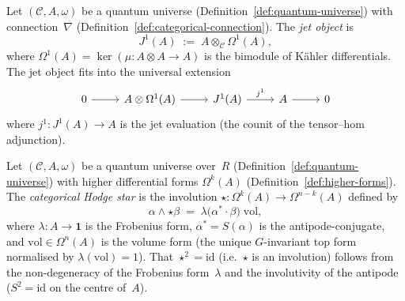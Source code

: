 \begin{definition}
\label{def:categorical-jet}
\leanok
Let $(\mathcal{C}, A, \omega)$ be a quantum universe
(Definition~\ref{def:quantum-universe}) with connection~$\nabla$
(Definition~\ref{def:categorical-connection}).  The \emph{jet
object} is
\[
  J^1(A) \;:=\; A \otimes_{\mathcal{C}} \Omega^1(A),
\]
where $\Omega^1(A) = \ker(\mu \colon A \otimes A \to A)$ is the
bimodule of K\"ahler differentials.  The jet object fits into the
universal extension
\begin{equation}\label{eq:jet-ses}
\begin{tikzcd}[column sep=2.5em]
  0 \ar[r]
  & A \otimes \Omega^1(A) \ar[r]
  & J^1(A) \ar[r, "j^1"]
  & A \ar[r]
  & 0
\end{tikzcd}
\end{equation}
where $j^1 \colon J^1(A) \to A$ is the jet evaluation (the counit of
the tensor--hom adjunction).
\end{definition}

\begin{definition}
\label{def:categorical-hodge-star}
Let $(\mathcal{C}, A, \omega)$ be a quantum universe over~$R$
(Definition~\ref{def:quantum-universe}) with higher differential forms
$\Omega^k(A)$ (Definition~\ref{def:higher-forms}).  The
\emph{categorical Hodge star} is the involution
$\star \colon \Omega^k(A) \to \Omega^{n-k}(A)$ defined by
\[
  \alpha \wedge \star \beta
  \;=\; \lambda\bigl(\alpha^* \cdot \beta\bigr)\;\mathrm{vol},
\]
where $\lambda \colon A \to \mathbf{1}$ is the Frobenius form,
$\alpha^* = S(\alpha)$ is the antipode-conjugate, and
$\mathrm{vol} \in \Omega^n(A)$ is the volume form
(the unique $G$-invariant top form normalised by
$\lambda(\mathrm{vol}) = 1$).
That $\star^2 = \mathrm{id}$ (i.e.\ $\star$ is an involution)
follows from the non-degeneracy of the Frobenius form~$\lambda$ and the
involutivity of the antipode ($S^2 = \mathrm{id}$ on the centre
of~$A$).
\end{definition}

